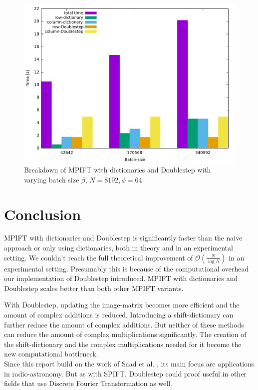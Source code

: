 \documentclass[12pt]{article}
\begin{document}
\begin{figure}[h]
	\includegraphics[width=380pt]{compare_ds_batchsize}
	\caption{Breakdown of MPIFT with dictionaries and Doublestep with varying batch size   $\beta$, $N=8192, \phi=64$.}
	\label{fig::compare_batchsize_DS}
\end{figure}


\newpage
\section{Conclusion}
\label{sec::conclusion}
MPIFT with dictionaries and Doublestep is significantly faster than the naive approach or only using dictionaries, both in theory and in an experimental setting. We couldn't reach the full theoretical improvement of $\mathcal{O}(\frac{N}{\log N})$ in an experimental setting. Presumably this is because of the computational overhead our implementation of Doublestep introduced. MPIFT with dictionaries and Doublestep scales better than both other MPIFT variants.

With Doublestep, updating the image-matrix becomes more efficient and the amount of complex additions is reduced. Introducing a shift-dictionary can further reduce the amount of complex additions. But neither of these methods can reduce the amount of complex multiplications significantly. The creation of the shift-dictionary and the complex multiplications needed for it become the new computational bottleneck.\\

Since this report build on the work of Saad et al. \cite{spift}, its main focus are applications in radio-astronomy. But as with SPIFT, Doublestep could proof useful in other fields that use Discrete Fourier Transformation as well.
\end{document}
